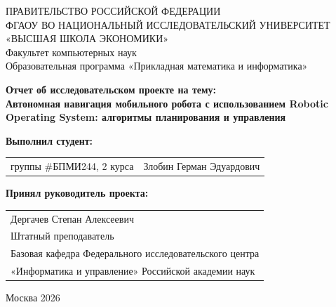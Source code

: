 \begin{titlepage}
\newpage

{
\begin{center}
ПРАВИТЕЛЬСТВО РОССИЙСКОЙ ФЕДЕРАЦИИ\\
ФГАОУ ВО НАЦИОНАЛЬНЫЙ ИССЛЕДОВАТЕЛЬСКИЙ УНИВЕРСИТЕТ\\
«ВЫСШАЯ ШКОЛА ЭКОНОМИКИ»
\\
\bigskip
Факультет компьютерных наук\\
Образовательная программа «Прикладная математика и информатика»
\end{center}
}

\vspace{10em}


\begin{center}
{\bf Отчет об исследовательском проекте на тему:}\\
{\bf Автономная навигация мобильного робота с использованием Robotic Operating System: алгоритмы планирования и управления}\\
\end{center}

\vspace{2em}

{\bf Выполнил студент: \vspace{2mm}}

{
\begin{tabular}{l@{\hskip 1.5cm}l}
группы \#БПМИ244, 2 курса & Злобин Герман Эдуардович \\
\end{tabular}}


\vspace{1em}
{\bf Принял руководитель проекта: \vspace{2mm}}

{
\begin{tabular}{l}
Дергачев Степан Алексеевич\\
Штатный преподаватель\\
Базовая кафедра Федерального исследовательского центра\\
«Информатика и управление» Российской академии наук
\end{tabular}}


\vspace{\fill}

\begin{center}
Москва 2026
\end{center}

\end{titlepage}